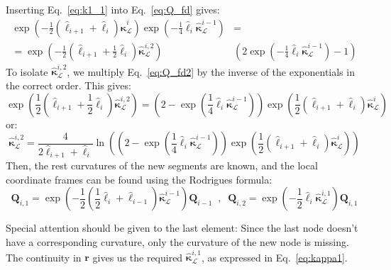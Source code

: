 \documentclass[a4paper, 11pt]{article}
\begin{document}
Inserting Eq.~\ref{eq:k1_1} into Eq.~\ref{eq:Q_fd} gives:
\begin{align}\label{eq:Q_fd2}
    \exp\left(-{\frac{1}{2}(\hat{\ell}_{i+1}+\hat{\ell}_{i})\hat{\boldsymbol{\kappa}}^i_\mathcal{L}}\right)\exp\left(-\frac{1}{4}\hat{\ell}_{i}\hat{\boldsymbol{\kappa}}^{i-1}_\mathcal{L}\right)&=\nonumber\\
    =\exp\left(-\frac{1}{2}(\hat{\ell}_{i+1}+\frac{1}{2}\hat{\ell}_{i})\hat{\boldsymbol{\kappa}}^{i,2}_\mathcal{L}\right)&\left(2\exp\left(-\frac{1}{4}\hat{\ell}_{i}\hat{\boldsymbol{\kappa}}^{i-1}_\mathcal{L}\right)-1\right)
\end{align}
To isolate $\hat{\boldsymbol{\kappa}}^{i,2}_\mathcal{L}$, we multiply Eq.~\ref{eq:Q_fd2} by the inverse of the exponentials in the correct order. This gives:
\begin{equation}
    \label{eq:Q_fd3}
    \exp{\left(\frac{1}{2}(\hat{\ell}_{i+1}+\frac{1}{2}\hat{\ell}_{i})\hat{\boldsymbol{\kappa}}^{i,2}_\mathcal{L}\right)}
    =\left(2-\exp{\left(\frac{1}{4}\hat{\ell}_{i}\hat{\boldsymbol{\kappa}}^{i-1}_\mathcal{L}\right)}\right) \exp{\left(\frac{1}{2}(\hat{\ell}_{i+1}+\hat{\ell}_{i})\hat{\boldsymbol{\kappa}}^i_\mathcal{L}\right)}
\end{equation}
or:
\begin{equation}
    \hat{\boldsymbol{\kappa}}^{i,2}_\mathcal{L}
    =\frac{4}{2\hat{\ell}_{i+1}+\hat{\ell}_i}\ln{\left(\left(2-\exp{\left(\frac{1}{4}\hat{\ell}_{i}\hat{\boldsymbol{\kappa}}^{i-1}_\mathcal{L}\right)}\right) \exp{\left(\frac{1}{2}(\hat{\ell}_{i+1}+\hat{\ell}_{i})\hat{\boldsymbol{\kappa}}^i_\mathcal{L}\right)}\right)}
\end{equation}
Then, the rest curvatures of the new segments are known, and the local coordinate frames can be found using the Rodrigues formula:
\begin{equation}
    \boldsymbol{Q}_{i,1}=\exp\left(-\frac{1}{2}(\frac{1}{2}\hat{\ell}_{i}+\hat{\ell}_{i-1})\hat{\boldsymbol{\kappa}}^{i-1}_\mathcal{L}\right)\boldsymbol{Q}_{i-1}\;\;,\;\;\boldsymbol{Q}_{i,2}=\exp\left(-\frac{1}{2}\hat{\ell}_i\hat{\boldsymbol{\kappa}}^{i,1}_\mathcal{L}\right)\boldsymbol{Q}_{i,1}
\end{equation}


\noindent Special attention should be given to the last element: Since the last node doesn't have a corresponding curvature, only the curvature of the new node is missing.  The continuity in $\boldsymbol{r}$ gives us the required $\hat{\boldsymbol{\kappa}}^{i,1}_\mathcal{L}$, as expressed in Eq.~\ref{eq:kappa1}. 
\end{document}

